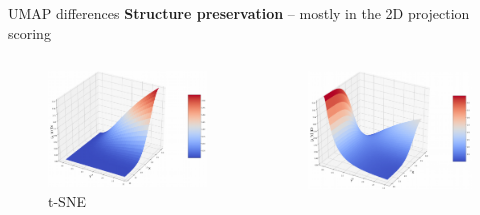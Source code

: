 \begin{frame}[allowframebreaks]{UMAP differences}
    \textbf{Structure preservation} – mostly in the 2D projection scoring
    \vspace{1em}
    \begin{columns}
    \begin{column}{0.4\textwidth}
        \begin{figure}
            \centering
            \includegraphics[width=1\textwidth,keepaspectratio]{images/dul/dim-reduce/slide_41_1_img.png}
            \caption{t-SNE}
        \end{figure}
    \end{column}
    \begin{column}{0.4\textwidth}
        \begin{figure}
            \centering
            \includegraphics[width=1\textwidth,keepaspectratio]{images/dul/dim-reduce/slide_41_2_img.png}

\end{figure}
\end{column}
\end{columns}
\end{frame}
